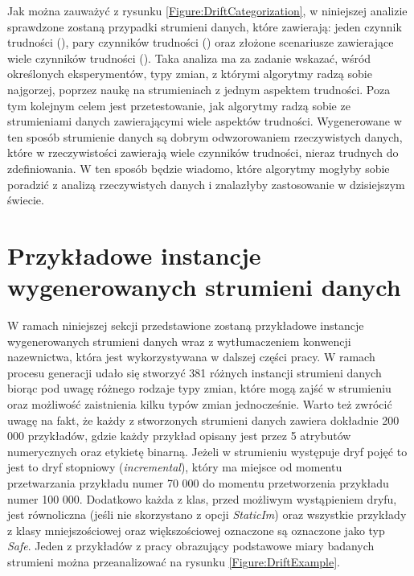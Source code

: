 \noindent Jak można zauważyć z rysunku \ref{Figure:DriftCategorization}, w niniejszej analizie sprawdzone zostaną przypadki strumieni danych, które zawierają: jeden czynnik trudności (), pary czynników trudności () oraz złożone scenariusze zawierające wiele czynników trudności (). Taka analiza ma za zadanie wskazać, wśród określonych eksperymentów, typy zmian, z którymi algorytmy radzą sobie najgorzej, poprzez naukę na strumieniach z jednym aspektem trudności. Poza tym kolejnym celem jest przetestowanie, jak algorytmy radzą sobie ze strumieniami danych zawierającymi wiele aspektów trudności. Wygenerowane w ten sposób strumienie danych są dobrym odwzorowaniem rzeczywistych danych, które w rzeczywistości zawierają wiele czynników trudności, nieraz trudnych do zdefiniowania. W ten sposób będzie wiadomo, które algorytmy mogłyby sobie poradzić z analizą rzeczywistych danych i znalazłyby zastosowanie w dzisiejszym świecie.

\section{Przykładowe instancje wygenerowanych strumieni danych}

\noindent W ramach niniejszej sekcji przedstawione zostaną przykładowe instancje wygenerowanych strumieni danych wraz z wytłumaczeniem konwencji nazewnictwa, która jest wykorzystywana w dalszej części pracy. W ramach procesu generacji udało się stworzyć 381 różnych instancji strumieni danych biorąc pod uwagę różnego rodzaje typy zmian, które mogą zajść w strumieniu oraz możliwość zaistnienia kilku typów zmian jednocześnie. Warto też zwrócić uwagę na fakt, że każdy z stworzonych strumieni danych zawiera dokładnie 200 000 przykładów, gdzie każdy przykład opisany jest przez 5 atrybutów numerycznych oraz etykietę binarną. Jeżeli w strumieniu występuje dryf pojęć to jest to dryf stopniowy (\textit{incremental}), który ma miejsce od momentu przetwarzania przykładu numer 70 000 do momentu przetworzenia przykładu numer 100 000. Dodatkowo każda z klas, przed możliwym wystąpieniem dryfu, jest równoliczna (jeśli nie skorzystano z opcji \textit{StaticIm}) oraz wszystkie przykłady z klasy mniejszościowej oraz większościowej oznaczone są oznaczone jako typ \textit{Safe}. Jeden z przykładów z pracy \cite{Article:TypyPrzykladow} obrazujący podstawowe miary badanych strumieni można przeanalizować na rysunku \ref{Figure:DriftExample}.

